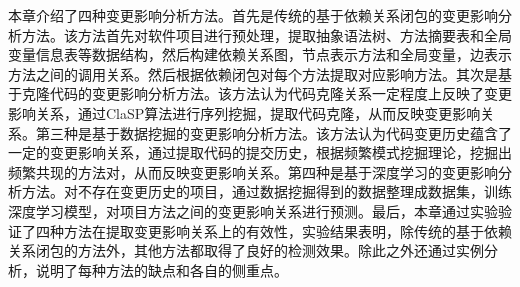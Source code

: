 本章介绍了四种变更影响分析方法。首先是传统的基于依赖关系闭包的变更影响分析方法。该方法首先对软件项目进行预处理，提取抽象语法树、方法摘要表和全局变量信息表等数据结构，然后构建依赖关系图，节点表示方法和全局变量，边表示方法之间的调用关系。然后根据依赖闭包对每个方法提取对应影响方法。其次是基于克隆代码的变更影响分析方法。该方法认为代码克隆关系一定程度上反映了变更影响关系，通过ClaSP算法进行序列挖掘，提取代码克隆，从而反映变更影响关系。第三种是基于数据挖掘的变更影响分析方法。该方法认为代码变更历史蕴含了一定的变更影响关系，通过提取代码的提交历史，根据频繁模式挖掘理论，挖掘出频繁共现的方法对，从而反映变更影响关系。第四种是基于深度学习的变更影响分析方法。对不存在变更历史的项目，通过数据挖掘得到的数据整理成数据集，训练深度学习模型，对项目方法之间的变更影响关系进行预测。最后，本章通过实验验证了四种方法在提取变更影响关系上的有效性，实验结果表明，除传统的基于依赖关系闭包的方法外，其他方法都取得了良好的检测效果。除此之外还通过实例分析，说明了每种方法的缺点和各自的侧重点。

